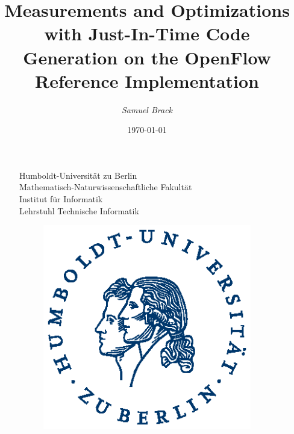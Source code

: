 \documentclass[xcolor=x11names,compress]{beamer}
\renewcommand{\(}{\begin{columns}}
\renewcommand{\)}{\end{columns}}
\newcommand{\<}[1]{\begin{column}{#1}}
\renewcommand{\>}{\end{column}}
\begin{document}
\begin{frame}
  \begin{figure}
    \begin{minipage}[c]{0.6\textwidth} 
    \tiny{Humboldt-Universität zu Berlin\\Mathematisch-Naturwissenschaftliche Fakultät\\Institut für Informatik\\Lehrstuhl Technische Informatik}
    \end{minipage}
    \hfill
    \begin{minipage}[c]{0.15\textwidth}
    \begin{figure}
      \includegraphics[width=\textwidth]{figures/HU_Logo}
    \end{figure}
    \end{minipage}
  \end{figure}

\title{\textbf{Measurements and Optimizations with Just-In-Time Code Generation on the OpenFlow Reference Implementation}}

\author{
  \vspace*{-1cm}
	\normalsize{\it Samuel Brack}\\
}
\date{\today}
\titlepage
\end{frame}
\end{document}
